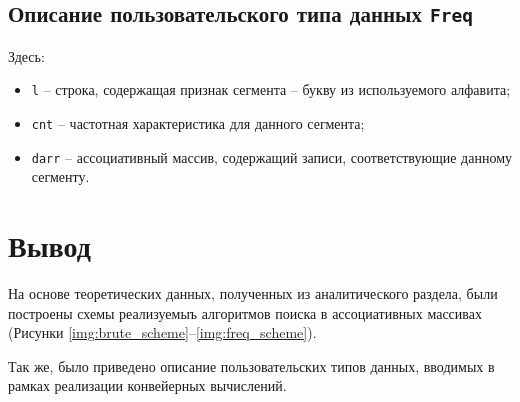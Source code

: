 \subsection{Описание пользовательского типа данных \texttt{Freq}}


Здесь:
\begin{itemize}
    \item \texttt{l} -- строка, содержащая признак сегмента -- букву из используемого алфавита;
    \item \texttt{cnt} -- частотная характеристика для данного сегмента;
    \item \texttt{darr} -- ассоциативный массив, содержащий записи, соответствующие данному сегменту.
\end{itemize}

\section{Вывод}

На основе теоретических данных, полученных из аналитического раздела, были построены схемы реализуемыъ алгоритмов поиска в ассоциативных массивах (Рисунки \ref{img:brute_scheme}--\ref{img:freq_scheme}).

Так же, было приведено описание пользовательских типов данных, вводимых в рамках реализации конвейерных вычислений.